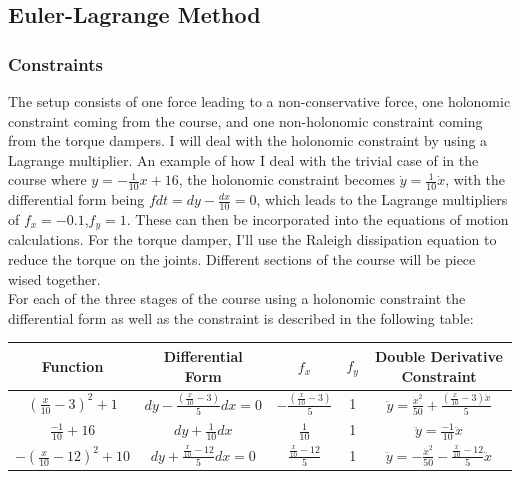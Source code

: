 \documentclass{article}
\begin{document}
\subsection{Euler-Lagrange Method}
\subsubsection{Constraints}
The setup consists of one force leading to a non-conservative force, one holonomic constraint coming from the course, and one non-holonomic constraint coming from the torque dampers. I will deal with the holonomic constraint by using a Lagrange multiplier.  An example of how I deal with the trivial case of in the course where $y=-\frac{1}{10}x+16$, the holonomic constraint becomes $\dot{y}=\frac{1}{10}\dot{x}$, with the differential form being $fdt=dy-\frac{dx}{10}=0$, which leads to the Lagrange multipliers of $f_x=-0.1$,$f_y=1$. These can then be incorporated into the equations of motion calculations.  For the torque damper, I’ll use the Raleigh dissipation equation to reduce the torque on the joints. Different sections of the course will be piece wised together. \\
For each of the three stages of the course using a holonomic constraint the differential form as well as the constraint is described in the following table:
\begin{center}
\begin{tabular}{c|c|c|c|c}
	Function&Differential Form&$f_x$&$f_y$&Double Derivative Constraint\\
	\hline
	$(\frac{x}{10}-3)^2+1$&$dy-\frac{\left(\frac{x}{10} - 3\right)}{5} dx=0$&$-\frac{\left(\frac{x}{10} - 3\right)}{5}$&1&$\ddot{y}=\frac{\dot{x}^2}{50} + \frac{\left(\frac{x}{10} - 3\right) \ddot{x}}{5}$\\
	$\frac{-1}{10}+16$&$dy+\frac{1}{10}dx$&$\frac{1}{10}$&1&$\ddot{y}=\frac{-1}{10}\ddot{x}$\\
	$-(\frac{x}{10}-12)^2+10$&$dy+\frac{\frac{x}{10}-12}{5}dx=0$&$\frac{\frac{x}{10}-12}{5}$&1&$\ddot{y}=-\frac{\dot{x}^2}{50}-\frac{\frac{x}{10}-12}{5}\ddot{x}$\\
\end{tabular}
\end{center}
\end{document}
